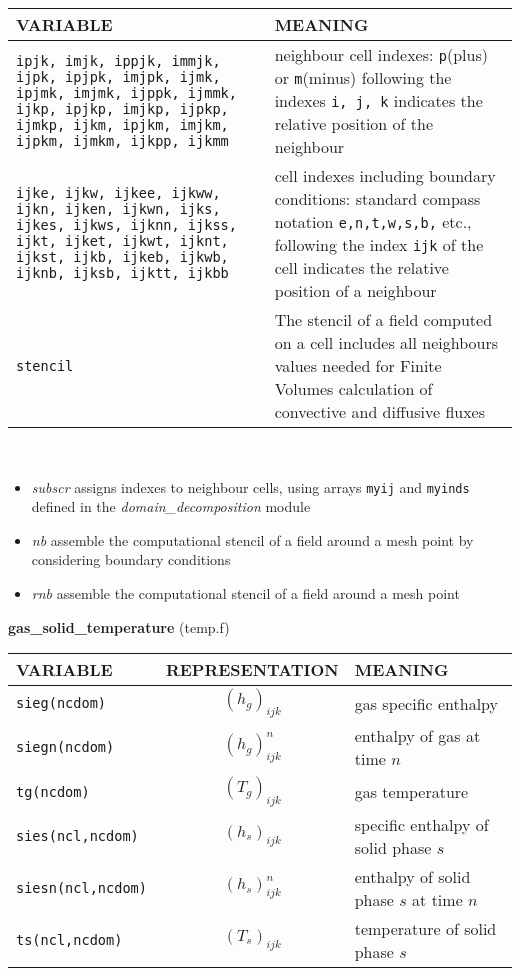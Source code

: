 \begin{tabular}{|p{6cm}|p{6cm}|}\hline
VARIABLE & MEANING \\ \hline
\tt ipjk, imjk, ippjk, immjk, ijpk, ipjpk, imjpk, ijmk, ipjmk, imjmk, ijppk, ijmmk, ijkp, ipjkp, imjkp, ijpkp, ijmkp, ijkm, ipjkm, imjkm, ijpkm, ijmkm, ijkpp, ijkmm & neighbour cell indexes: {\tt p}(plus) or {\tt m}(minus) following the indexes {\tt i, j, k} indicates the relative position of the neighbour\\\hline
\tt ijke, ijkw, ijkee, ijkww, ijkn, ijken, ijkwn, ijks, ijkes, ijkws, ijknn, ijkss, ijkt, ijket, ijkwt, ijknt, ijkst, ijkb, ijkeb, ijkwb, ijknb, ijksb, ijktt, ijkbb & cell indexes including boundary conditions: standard compass notation {\tt e,n,t,w,s,b,} etc., following the index {\tt ijk} of the cell indicates the relative position of a neighbour \\\hline
\tt stencil & The stencil of a field computed on a cell includes all neighbours values needed for Finite Volumes calculation of convective and diffusive fluxes \\\hline
\end{tabular}\\
\begin{itemize}
\item{\em subscr} assigns indexes to neighbour cells, using arrays {\tt myij} and {\tt myinds} defined in the {\em domain\_decomposition} module\\
\item{\em nb} assemble the computational stencil of a field around a mesh point by considering boundary conditions
\item{\em rnb} assemble the computational stencil of a field around a mesh point
\end{itemize}
%
%
{\large {\bf gas\_solid\_temperature}} (temp.f)\\[5mm]
\begin{tabular}{|p{6cm}|c|p{6cm}|}\hline
VARIABLE & REPRESENTATION & MEANING\\\hline
\tt sieg(ncdom) & $(h_g)_{ijk}$ &  gas specific enthalpy \\\hline 
\tt siegn(ncdom) & $(h_g)^{n}_{ijk}$ &  enthalpy of gas at time $n$\\\hline
\tt tg(ncdom) & $(T_g)_{ijk}$ &  gas temperature\\\hline
\tt sies(ncl,ncdom) & $(h_s)_{ijk}$ &  specific enthalpy of solid phase $s$ \\\hline
\tt siesn(ncl,ncdom) & $(h_s)^{n}_{ijk}$ &  enthalpy of solid phase $s$ at time $n$\\\hline
\tt ts(ncl,ncdom) & $(T_s)_{ijk}$ &  temperature of solid phase $s$\\\hline
\end{tabular}\\[5mm]
